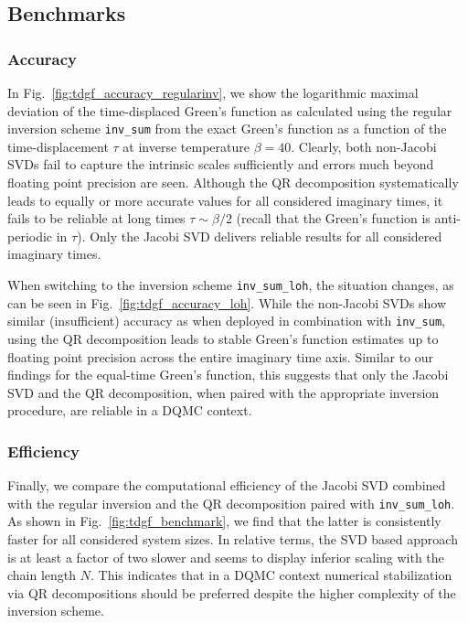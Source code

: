 \documentclass[submission, Phys]{SciPost}
\begin{document}
\subsection{Benchmarks}
\subsubsection{Accuracy}

In Fig.~\ref{fig:tdgf_accuracy_regularinv}, we show the logarithmic maximal deviation of the time-displaced Green's function as calculated using the regular inversion scheme \texttt{inv\_sum} from the exact Green's function as a function of the time-displacement $\tau$ at inverse temperature $\beta=40$. Clearly, both non-Jacobi SVDs fail to capture the intrinsic scales sufficiently and errors much beyond floating point precision are seen. Although the QR decomposition systematically leads to equally or more accurate values for all considered imaginary times, it fails to be reliable at long times $\tau\sim\beta/2$ (recall that the Green's function is anti-periodic in $\tau$). Only the Jacobi SVD delivers reliable results for all considered imaginary times.

When switching to the inversion scheme \texttt{inv\_sum\_loh}, the situation changes, as can be seen in Fig.~\ref{fig:tdgf_accuracy_loh}. While the non-Jacobi SVDs show similar (insufficient) accuracy as when deployed in combination with \texttt{inv\_sum}, using the QR decomposition leads to stable Green's function estimates up to floating point precision across the entire imaginary time axis. Similar to our findings for the equal-time Green's function, this suggests that only the Jacobi SVD and the QR decomposition, when paired with the appropriate inversion procedure, are reliable in a DQMC context.

\subsubsection{Efficiency}\label{sec:tdgfbenchmark}

Finally, we compare the computational efficiency of the Jacobi SVD combined with the regular inversion and the QR decomposition paired with \texttt{inv\_sum\_loh}. As shown in Fig.~\ref{fig:tdgf_benchmark}, we find that the latter is consistently faster for all considered system sizes. In relative terms, the SVD based approach is at least a factor of two slower and seems to display inferior scaling with the chain length $N$. This indicates that in a DQMC context numerical stabilization via QR decompositions should be preferred despite the higher complexity of the inversion scheme.
\end{document}
